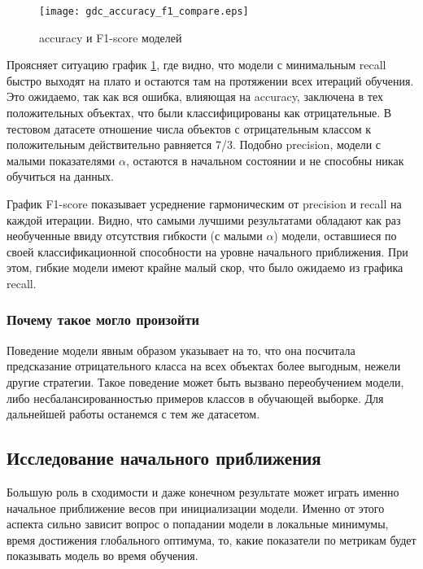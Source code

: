 \documentclass{article}
\begin{document}
    \begin{figure}[h]
        \centering
        \texttt{[image: gdc\_accuracy\_f1\_compare.eps]}
        \caption{accuracy и F1-score моделей}
        \label{fig:accuracy_f1_gdc}
    \end{figure}

        Проясняет ситуацию график \ref{fig:accuracy_f1_gdc}, где видно, что модели с минимальным recall быстро выходят на плато и остаются там на протяжении всех итераций обучения. Это ожидаемо, так как вся ошибка, влияющая на accuracy, заключена в тех положительных объектах, что были классифицированы как отрицательные. В тестовом датасете отношение числа объектов с отрицательным классом к положительным действительно равняется 7/3. Подобно precision, модели с малыми показателями $\alpha$, остаются в начальном состоянии и не способны никак обучиться на данных. 

        График F1-score показывает усреднение гармоническим от precision и recall на каждой итерации. Видно, что самыми лучшими результатами обладают как раз необученные ввиду отсутствия гибкости (с малыми $\alpha$) модели, оставшиеся по своей классификационной способности на уровне начального приближения. При этом, гибкие модели имеют крайне малый скор, что было ожидаемо из графика recall.

    \subsubsection{Почему такое могло произойти}

        Поведение модели явным образом указывает на то, что она посчитала предсказание отрицательного класса на всех объектах более выгодным, нежели другие стратегии. Такое поведение может быть вызвано переобучением модели, либо несбалансированностью примеров классов в обучающей выборке. Для дальнейшей работы останемся с тем же датасетом.

    \subsection{Исследование начального приближения}

        Большую роль в сходимости и даже конечном результате может играть именно начальное приближение весов при инициализации модели. Именно от этого аспекта сильно зависит вопрос о попадании модели в локальные минимумы, время достижения глобального оптимума, то, какие показатели по метрикам будет показывать модель во время обучения.
        
\end{document}
